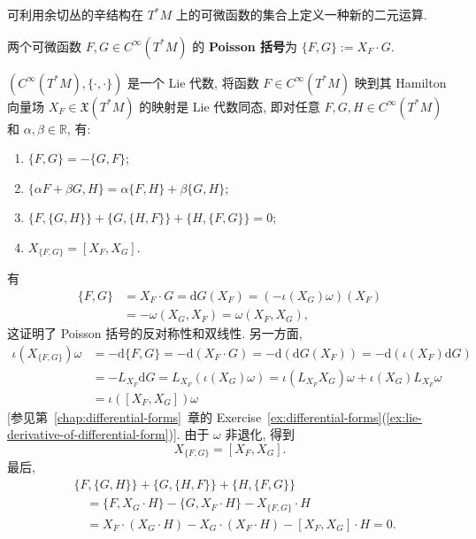 可利用余切丛的辛结构在 $T^*M$ 上的可微函数的集合上定义一种新的二元运算.

\begin{RiemannDefinition}\label{def:poisson-bracket}
两个可微函数 $F,G\in C^\infty(T^*M)$ 的 \textbf{Poisson 括号}为 $\{F,G\}:=X_F\cdot G$.
\end{RiemannDefinition}

\begin{RiemannProposition}\label{prop:poisson-bracket-lie-algebra}
$(C^\infty(T^*M),\{\cdot,\cdot\})$ 是一个 Lie 代数, 将函数 $F\in C^\infty(T^*M)$ 映到其 Hamilton 向量场 $X_F\in\mathfrak{X}(T^*M)$ 的映射是 Lie 代数同态, 即对任意 $F,G,H\in C^\infty(T^*M)$ 和 $\alpha,\beta\in\mathbb{R}$, 有:
\begin{enumerate}[label=(\roman*),leftmargin=*]
\item $\{F,G\}=-\{G,F\}$;
\item $\{\alpha F+\beta G,H\}=\alpha\{F,H\}+\beta\{G,H\}$;
\item $\{F,\{G,H\}\}+\{G,\{H,F\}\}+\{H,\{F,G\}\}=0$;
\item $X_{\{F,G\}}=[X_F,X_G]$.
\end{enumerate}
\end{RiemannProposition}

\begin{RiemannProof}
有
\begin{align*}
  \{F,G\}&=X_F\cdot G=\mathrm{d}G(X_F)=(-\iota(X_G)\omega)(X_F)\\
  &=-\omega(X_G,X_F)=\omega(X_F,X_G),
\end{align*}
这证明了 Poisson 括号的反对称性和双线性. 另一方面,
\begin{align*}
  \iota(X_{\{F,G\}})\omega
   &=-\mathrm{d}\{F,G\}
    =-\mathrm{d}(X_F\cdot G)
    =-\mathrm{d}(\mathrm{d}G(X_F))
    =-\mathrm{d}(\iota(X_F)\mathrm{d}G)\\
   &=-L_{X_F}\mathrm{d}G
    =L_{X_F}(\iota(X_G)\omega)
    =\iota(L_{X_F}X_G)\omega+\iota(X_G)L_{X_F}\omega\\
   &=\iota([X_F,X_G])\omega
\end{align*}
[参见第~\ref{chap:differential-forms}~章的 Exercise~\ref{ex:differential-forms}(\ref{ex:lie-derivative-of-differential-form})]. 由于 $\omega$ 非退化, 得到
\[
  X_{\{F,G\}}=[X_F,X_G].
\]
最后,
\begin{align*}
  &\{F,\{G,H\}\}+\{G,\{H,F\}\}+\{H,\{F,G\}\}\\
  &\quad=\{F,X_G\cdot H\}-\{G,X_F\cdot H\}-X_{\{F,G\}}\cdot H\\
  &\quad=X_F\cdot(X_G\cdot H)-X_G\cdot(X_F\cdot H)-[X_F,X_G]\cdot H=0.
\end{align*}
\end{RiemannProof}

